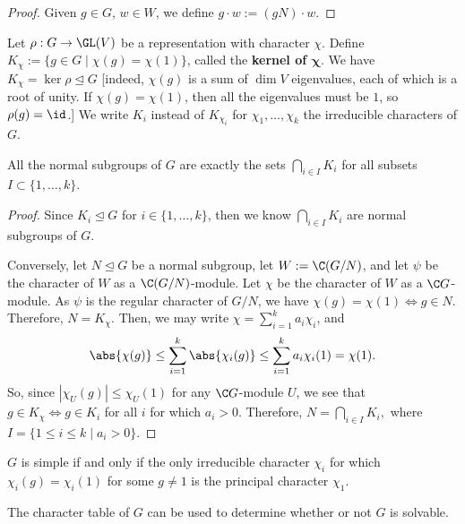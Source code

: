 \begin{proof}
    Given $g \in G$, $w \in W$, we define $g\cdot w :=(gN)\cdot w$.
\end{proof}

\begin{defn}
    Let $\rho:G \to \GL(V)$ be a representation with character $\chi$. Define $K_\chi:=\{ g \in G \mid \chi(g) = \chi (1)\}$, called the \textbf{kernel of $\bm \chi$}. We have $K_\chi =\ker \rho \unlhd G$ [indeed, $\chi (g)$ is a sum of $\dim V$ eigenvalues, each of which is a root of unity. If $\chi(g)=\chi(1)$, then all the eigenvalues must be $1$, so $\rho(g)=\id$.] We write $K_i$ instead of $K_{\chi_i}$ for $\chi_1,\dots, \chi_k$ the irreducible characters of $G$.
\end{defn}

\begin{prop}
    All the normal subgroups of $G$ are exactly the sets $\bigcap _{i \in I}K_i$ for all subsets $I \subset \{1,\dots,k\}$.
\end{prop}

\begin{proof}
    Since $K_i \unlhd G$ for $i \in \{1,\dots,k\}$, then we know $\bigcap _{i \in I}K_i$ are normal subgroups of $G$.

    Conversely, let $N \unlhd G$ be a normal subgroup, let $W:= \C(G/N)$, and let $\psi$ be the character of $W$ as a $\C(G/N)$-module. Let $\chi$ be the character of $W$ as a $\C G$-module. As $\psi$ is the regular character of $G/N$, we have $\chi(g)=\chi(1) \iff g \in N$. Therefore, $N=K_\chi$. Then, we may write $\chi = \sum_{i=1}^k a_i\chi_i$, and
    $$\abs{\chi(g)}\leq \sum_{i=1}^k\abs{\chi_i(g)}\leq \sum_{i=1}^ka_i\chi_i(1)=\chi(1).$$
    So, since $|\chi_U(g)| \leq \chi_U(1)$ for any $\C G$-module $U$, we see that $g \in K_\chi \iff g \in K_i$ for all $i$ for which $a_i>0$. Therefore, $N = \bigcap_{i \in I} K_i,$ where $I = \{1 \leq i \leq k \mid a_i>0\}$.
\end{proof}

\begin{cor}
    $G$ is simple if and only if the only irreducible character $\chi_i$ for which $\chi_i(g)=\chi_i(1)$ for some $g\neq 1$ is the principal character $\chi_1$.
\end{cor}

\begin{cor}
    The character table of $G$ can be used to determine whether or not $G$ is solvable.
\end{cor}

